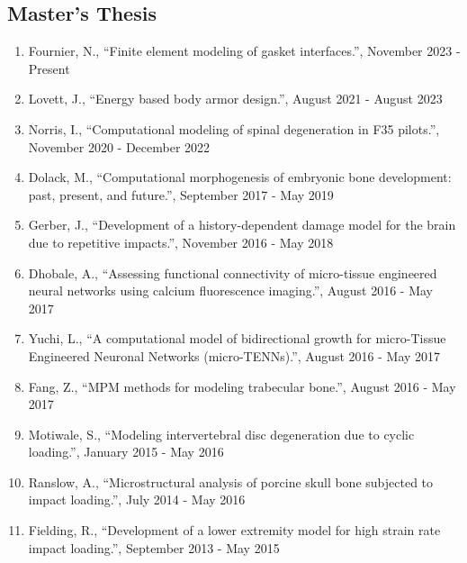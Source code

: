 \documentclass[a4paper,10pt]{article}
\begin{document}
    \subsection*{Master’s Thesis}
    \begin{enumerate}
    
        \item Fournier, N., ``Finite element modeling of gasket interfaces.'', November 2023 - Present
        
        \item Lovett, J., ``Energy based body armor design.'', August 2021 - August 2023
        
        \item Norris, I., ``Computational modeling of spinal degeneration in F35 pilots.'', November 2020 - December 2022
        
        \item Dolack, M., ``Computational morphogenesis of embryonic bone development: past, present, and future.'', September 2017 - May 2019
        
        \item Gerber, J., ``Development of a history-dependent damage model for the brain due to repetitive impacts.'', November 2016 - May 2018
        
        \item Dhobale, A., ``Assessing functional connectivity of micro-tissue engineered neural networks using calcium fluorescence imaging.'', August 2016 - May 2017
        
        \item Yuchi, L., ``A computational model of bidirectional growth for micro-Tissue Engineered Neuronal Networks (micro-TENNs).'', August 2016 - May 2017
        
        \item Fang, Z., ``MPM methods for modeling trabecular bone.'', August 2016 - May 2017
        
        \item Motiwale, S., ``Modeling intervertebral disc degeneration due to cyclic loading.'', January 2015 - May 2016
        
        \item Ranslow, A., ``Microstructural analysis of porcine skull bone subjected to impact loading.'', July 2014 - May 2016
        
        \item Fielding, R., ``Development of a lower extremity model for high strain rate impact loading.'', September 2013 - May 2015
        
    \end{enumerate}
    
\end{document}
